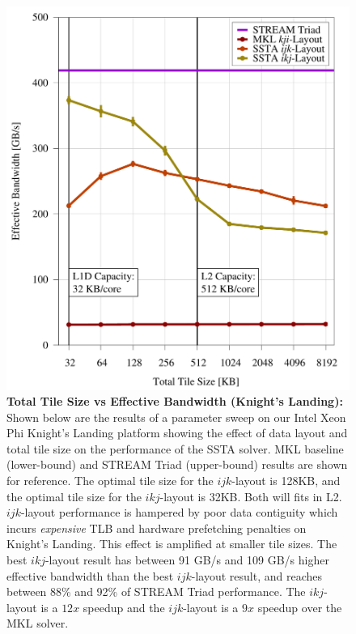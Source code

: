 \documentclass{sig-alternate-05-2015}
\begin{document}
\begin{figure}[!h]
    \centering
    \caption{
      \textbf{Total Tile Size vs Effective Bandwidth (Knight's Landing):}
      Shown below are the results of a parameter sweep on our Intel Xeon Phi
        Knight's Landing platform showing the effect of data layout and total
        tile size on the performance of the SSTA solver.
      MKL baseline (lower-bound) and STREAM Triad (upper-bound) results are shown
        for reference.
      The optimal tile size for the \(ijk\)-layout is 128KB, and the optimal
        tile size for the \(ikj\)-layout is 32KB.
      Both will fits in L2.
      \(ijk\)-layout performance is hampered by poor data contiguity which incurs
        \emph{expensive} TLB and hardware prefetching penalties on Knight's
        Landing.
      This effect is amplified at smaller tile sizes.
      The best \(ikj\)-layout result has between 91 GB/s and 109 GB/s higher
        effective bandwidth than the best \(ijk\)-layout result, and reaches
        between 88\% and 92\% of STREAM Triad performance.
      The \(ikj\)-layout is a \(12x\) speedup and the \(ijk\)-layout is a
        \(9x\) speedup over the MKL solver.
    }
    \label{fig:results:tile_size_knl}
    \includegraphics[width=0.95\columnwidth]{figures/post_tsb_tw_sweep_full_matrix_double_precision_production_carl_knl_7210_09_02_2016_64pus.pdf}
\end{figure}
\end{document}
